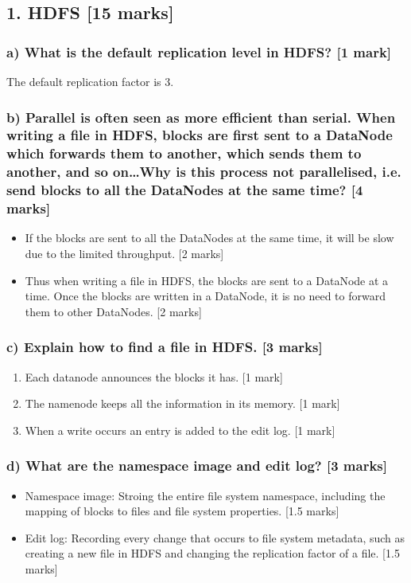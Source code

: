 \documentclass[11pt,a4paper]{article}
\begin{document}
\subsection*{1. HDFS [15 marks]}
\subsubsection*{a) What is the default replication level in HDFS? [1 mark]}
The default replication factor is 3.
\subsubsection*{b) Parallel is often seen as more efficient than serial. When writing a file in HDFS, blocks are first sent to a DataNode which forwards them to another, which sends them to another, and so on…Why is this process not parallelised, i.e. send blocks to all the DataNodes at the same time? [4 marks]}

\begin{itemize}
\item If the blocks are sent to all the DataNodes at the same time, it will be slow due to the limited throughput. [2 marks]
\item Thus when writing a file in HDFS, the blocks are sent to a DataNode at a time. Once the blocks are written in a DataNode, it is no need to forward them to other DataNodes. [2 marks]
\end{itemize}

\subsubsection*{c) Explain how to find a file in HDFS. [3 marks]}
\begin{enumerate}
	\item Each datanode announces the blocks it has. [1 mark]
	\item The namenode keeps all the information in its memory. [1 mark]
	\item When a write occurs an entry is added to the edit log. [1 mark]
\end{enumerate}

\subsubsection*{d) What are the namespace image and edit log? [3 marks]}

\begin{itemize}
\item Namespace image: Stroing the entire file system namespace,  including the mapping of blocks to files and file system properties. [1.5 marks]
\item Edit log: Recording every change that occurs to file system metadata, such as creating a new file in HDFS and changing the replication factor of a file. [1.5 marks]
\end{itemize}
\end{document}
